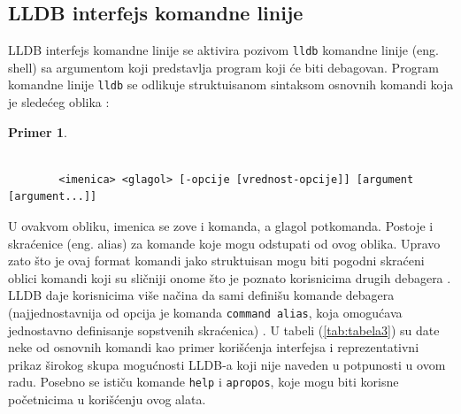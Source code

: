 \documentclass[a4paper]{article}
\newtheorem{primer}{Primer}[section]
\begin{document}
\subsection{LLDB interfejs komandne linije}
LLDB interfejs komandne linije se aktivira pozivom \verb|lldb| komandne linije (eng. shell) sa argumentom koji predstavlja program koji će biti debagovan. Program komandne linije \verb|lldb| se odlikuje struktuisanom sintaksom osnovnih komandi koja je sledećeg oblika \cite{lldb_tutorial}:
\begin{primer}
	\begin{footnotesize}
		\begin{verbatim}
		
		<imenica> <glagol> [-opcije [vrednost-opcije]] [argument [argument...]]
		\end{verbatim}
	\end{footnotesize}
\end{primer}
U ovakvom obliku, imenica se zove i komanda, a glagol potkomanda. Postoje i skraćenice (eng. alias) za komande koje mogu odstupati od ovog oblika. Upravo zato što je ovaj format komandi jako struktuisan mogu biti pogodni skraćeni oblici komandi koji su sličniji onome što je poznato korisnicima drugih debagera \cite{apple_lldb_comms}. LLDB daje korisnicima više načina da sami definišu komande debagera (najjednostavnija od opcija je komanda \verb|command alias|, koja omogućava jednostavno definisanje sopstvenih skraćenica) \cite{book}. U tabeli (\ref{tab:tabela3}) su date neke od osnovnih komandi kao primer korišćenja interfejsa i reprezentativni prikaz širokog skupa mogućnosti LLDB-a koji nije naveden u potpunosti u ovom radu. Posebno se ističu komande \verb|help| i \verb|apropos|, koje mogu biti korisne početnicima u korišćenju ovog alata.
\end{document}
